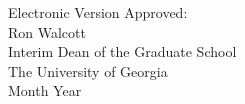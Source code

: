 \documentclass[12pt, notitlepage]{report} %
\begin{document}
\vspace*{3cm}

\begin{flushleft}
  Electronic Version Approved:\\[12pt]
  Ron Walcott\\
  Interim Dean of the Graduate School\\
  The University of Georgia\\
  Month Year
\end{flushleft}
\vspace*{1.5cm}







\tableofcontents

\listoffigures
{}
\listoftables
\clearpage









\begin{appendices}
  
\end{appendices}

\newpage
{} %
\printbibliography[title={Bibliography}]
\end{document}
